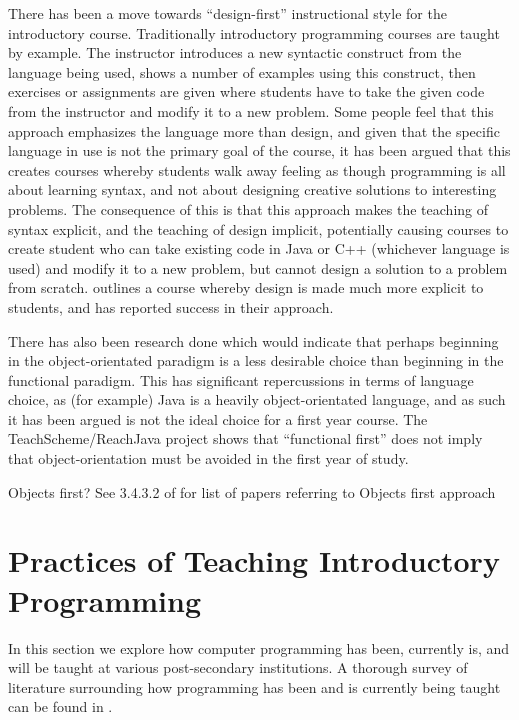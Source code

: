 There has been a move towards ``design-first'' instructional style for the introductory course.  Traditionally introductory programming courses are taught by example.  The instructor introduces a new syntactic construct from the language being used, shows a number of examples using this construct, then exercises or assignments are given where students have to take the given code from the instructor and modify it to a new problem.  Some people feel that this approach emphasizes the language more than design, and given that the specific language in use is not the primary goal of the course, it has been argued that this creates courses whereby students walk away feeling as though programming is all about learning syntax, and not about designing creative solutions to interesting problems.  The consequence of this is that this approach makes the teaching of syntax explicit, and the teaching of design implicit, potentially causing courses to create student who can take existing code in Java or C++ (whichever language is used) and modify it to a new problem, but cannot design a solution to a problem from scratch.  \cite{Flatt04} outlines a course whereby design is made much more explicit to students, and has reported success in their approach.

There has also been research done which would indicate that perhaps beginning in the object-orientated paradigm is a less desirable choice than beginning in the functional paradigm\cite{Flatt04,Huch05}.  This has significant repercussions in terms of language choice, as (for example) Java is a heavily object-orientated language, and as such it has been argued is not the ideal choice for a first year course\cite{Bos98,Huch05}.  The TeachScheme/ReachJava project shows that ``functional first'' does not imply that object-orientation must be avoided in the first year of study\cite{Bloch08,teachScheme,Felleisen04}.



Objects first?  See 3.4.3.2 of \cite{Pears07} for list of papers referring to Objects first approach

\section{Practices of Teaching Introductory Programming}

In this section we explore how computer programming has been, currently is, and will be taught at various post-secondary institutions.  A thorough survey of literature surrounding how programming has been and is currently being taught can be found in \cite{Pears07}.

